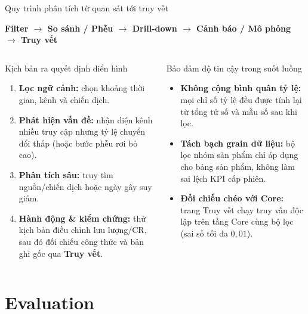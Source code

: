 \documentclass[aspectratio=169]{beamer}
\begin{document}
\begin{frame}{Quy trình phân tích từ quan sát tới truy vết}
  \small
  \begin{center}
    \textbf{Filter $\rightarrow$ So sánh / Phễu $\rightarrow$ Drill-down
    $\rightarrow$ Cảnh báo / Mô phỏng $\rightarrow$ Truy vết}
  \end{center}
  \vspace{0.1cm}
  \begin{columns}[T,onlytextwidth]
    \begin{block}{Kịch bản ra quyết định điển hình}
      \scriptsize
      \begin{enumerate}
        \item \textbf{Lọc ngữ cảnh:} chọn khoảng thời gian, kênh và chiến dịch.
        \item \textbf{Phát hiện vấn đề:} nhận diện kênh nhiều truy cập nhưng tỷ lệ chuyển đổi thấp (hoặc bước phễu rơi bỏ cao).
        \item \textbf{Phân tích sâu:} truy tìm nguồn/chiến dịch hoặc ngày gây suy giảm.
        \item \textbf{Hành động \& kiểm chứng:} thử kịch bản điều chỉnh lưu lượng/CR, sau đó đối chiếu công thức và bản ghi gốc qua \textbf{Truy vết}.
      \end{enumerate}
    \end{block}

    \begin{exampleblock}{Bảo đảm độ tin cậy trong suốt luồng}
      \scriptsize
      \begin{itemize}
        \item \textbf{Không cộng bình quân tỷ lệ:} mọi chỉ số tỷ lệ đều được tính lại từ tổng tử số và mẫu số sau khi lọc.
        \item \textbf{Tách bạch grain dữ liệu:} bộ lọc nhóm sản phẩm chỉ áp dụng cho bảng sản phẩm, không làm sai lệch KPI cấp phiên.
        \item \textbf{Đối chiếu chéo với Core:} trang Truy vết chạy truy vấn độc lập trên tầng Core cùng bộ lọc (sai số tối đa $0{,}01$).
      \end{itemize}
      \vspace{0.7cm}
    \end{exampleblock}
  \end{columns}
\end{frame}


\section{Evaluation}
\end{document}
